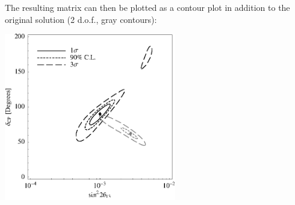 {The resulting matrix can then be plotted as a contour plot in addition to the original solution (2 d.o.f., gray contours):
\begin{center}
\colorbox{white}{\includegraphics[width=7.5cm]{correntex}}
\end{center}

}

